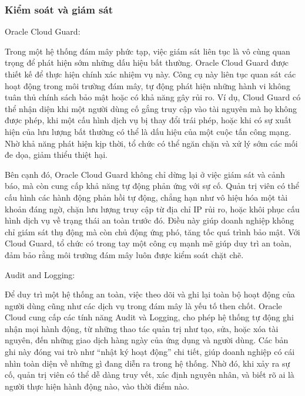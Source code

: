 \subsubsection{Kiểm soát và giám sát}
\begin{myitem}
    \item Oracle Cloud Guard:
    \begin{mysubitem}
        \item Trong một hệ thống đám mây phức tạp, việc giám sát liên tục là vô cùng quan trọng để phát hiện sớm những dấu hiệu bất thường. Oracle Cloud Guard được thiết kế để thực hiện chính xác nhiệm vụ này. Công cụ này liên tục quan sát các hoạt động trong môi trường đám mây, tự động phát hiện những hành vi không tuân thủ chính sách bảo mật hoặc có khả năng gây rủi ro. Ví dụ, Cloud Guard có thể nhận diện khi một người dùng cố gắng truy cập vào tài nguyên mà họ không được phép, khi một cấu hình dịch vụ bị thay đổi trái phép, hoặc khi có sự xuất hiện của lưu lượng bất thường có thể là dấu hiệu của một cuộc tấn công mạng. Nhờ khả năng phát hiện kịp thời, tổ chức có thể ngăn chặn và xử lý sớm các mối đe dọa, giảm thiểu thiệt hại.

        \item Bên cạnh đó, Oracle Cloud Guard không chỉ dừng lại ở việc giám sát và cảnh báo, mà còn cung cấp khả năng tự động phản ứng với sự cố. Quản trị viên có thể cấu hình các hành động phản hồi tự động, chẳng hạn như vô hiệu hóa một tài khoản đáng ngờ, chặn lưu lượng truy cập từ địa chỉ IP rủi ro, hoặc khôi phục cấu hình dịch vụ về trạng thái an toàn trước đó. Điều này giúp doanh nghiệp không chỉ giám sát thụ động mà còn chủ động ứng phó, tăng tốc quá trình bảo mật. Với Cloud Guard, tổ chức có trong tay một công cụ mạnh mẽ giúp duy trì an toàn, đảm bảo rằng môi trường đám mây luôn được kiểm soát chặt chẽ.
    \end{mysubitem}

    \item Audit and Logging:
    \begin{mysubitem}
        \item Để duy trì một hệ thống an toàn, việc theo dõi và ghi lại toàn bộ hoạt động của người dùng cũng như các dịch vụ trong đám mây là yếu tố then chốt. Oracle Cloud cung cấp các tính năng Audit và Logging, cho phép hệ thống tự động ghi nhận mọi hành động, từ những thao tác quản trị như tạo, sửa, hoặc xóa tài nguyên, đến những giao dịch hàng ngày của ứng dụng và người dùng. Các bản ghi này đóng vai trò như “nhật ký hoạt động” chi tiết, giúp doanh nghiệp có cái nhìn toàn diện về những gì đang diễn ra trong hệ thống. Nhờ đó, khi xảy ra sự cố, quản trị viên có thể dễ dàng truy vết, xác định nguyên nhân, và biết rõ ai là người thực hiện hành động nào, vào thời điểm nào.


\end{mysubitem}
\end{myitem}
